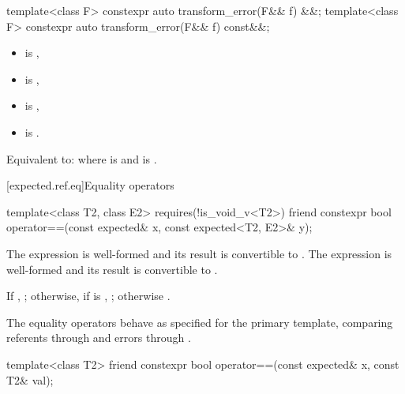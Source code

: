 %
\begin{itemdecl}
template<class F>
  constexpr auto transform_error(F&& f) &&;
template<class F>
  constexpr auto transform_error(F&& f) const&&;
\end{itemdecl}

\begin{itemdescr}
\pnum
\mandates
\begin{itemize}
\item {} is ,
\item {} is ,
\item {} is ,
\item {} is .
\end{itemize}

\pnum
\effects
Equivalent to:  where  is  and  is .
\end{itemdescr}

[expected.ref.eq]{Equality operators}

%
\begin{itemdecl}
template<class T2, class E2>
  requires(!is_void_v<T2>)
  friend constexpr bool operator==(const expected& x, const expected<T2, E2>& y);
\end{itemdecl}

\begin{itemdescr}
\pnum
\mandates
The expression  is well-formed and its result is convertible to . The expression  is well-formed and its result is convertible to .

\pnum
\returns
If , ; otherwise, if  is , ; otherwise .

\pnum
\remarks
The equality operators behave as specified for the primary template, comparing referents through  and errors through .
\end{itemdescr}

%
\begin{itemdecl}
template<class T2>
  friend constexpr bool operator==(const expected& x, const T2& val);
\end{itemdecl}

